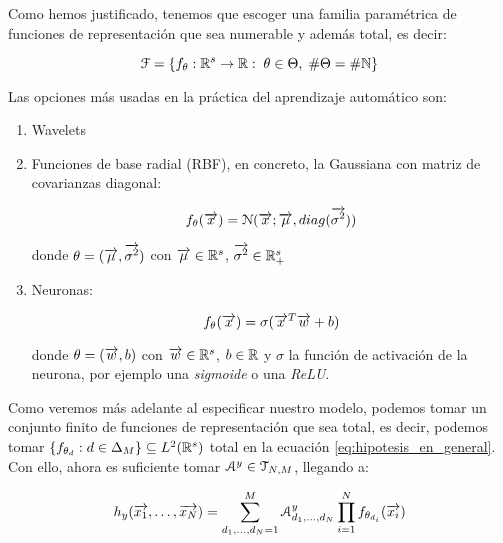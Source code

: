 Como hemos justificado, tenemos que escoger una familia paramétrica de funciones de representación que sea numerable y además total, es decir:

\begin{equation}
	\mathcal{F} = \{  f_{\theta}: \mathbb{R}^s \to \mathbb{R}: \; \theta \in \Theta, \; \# \Theta = \# \mathbb{N}  \}
\end{equation}

Las opciones más usadas en la práctica del aprendizaje automático son:

\begin{enumerate}
	\item Wavelets
	\item Funciones de base radial (RBF), en concreto, la Gaussiana con matriz de covarianzas diagonal:

	      \begin{equation}
		      f_\theta(\overrightarrow{x}) = \mathcal{N}(\overrightarrow{x}; \overrightarrow{\mu}, diag(\overrightarrow{\sigma^2}))
	      \end{equation}

	      donde $\theta = (\overrightarrow{\mu}, \overrightarrow{\sigma^2})$ con $\overrightarrow{\mu} \in \mathbb{R}^s$, $\overrightarrow{\sigma^2} \in \mathbb{R}^s_+$

	\item Neuronas:

	      \begin{equation}
		      f_\theta(\overrightarrow{x}) = \sigma(\overrightarrow{x}^T \overrightarrow{w} + b)
	      \end{equation}

	      donde $\theta = (\overrightarrow{w}, b)$ con $\overrightarrow{w} \in \mathbb{R}^s$, $b \in \mathbb{R}$ y $\sigma$ la función de activación de la neurona, por ejemplo una \textit{sigmoide} o una \textit{ReLU}.



\end{enumerate}

Como veremos más adelante al especificar nuestro modelo, podemos tomar un conjunto finito de funciones de representación que sea total, es decir, podemos tomar $\{f_{\theta_d}: d \in \Delta_{M}\} \subseteq L^2(\mathbb{R}^s)$ total en la ecuación \eqref{eq:hipotesis_en_general}. Con ello, ahora es suficiente tomar $\mathcal{A}^y \in \mathcal{T}_{N, M}$, llegando a:

\begin{equation}
	h_y(\overrightarrow{x_1}, \ldots, \overrightarrow{x_N}) = \sum_{d_1, \ldots, d_N = 1}^{M} \mathcal{A}^y_{d_1, \ldots, d_N} \prod_{i = 1}^N f_{\theta_{d_i}}(\overrightarrow{x_i})
\end{equation}

